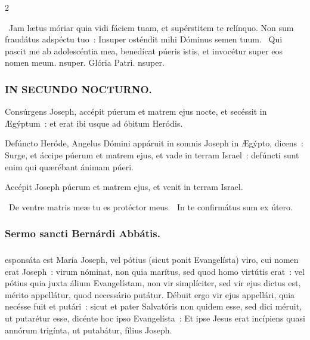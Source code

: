 \documentclass[9pt,twoside]{extarticle}
\begin{document}
\begin{multicols}{2}
{{{\begin{tightlist}{}
\item {}~Jam lætus móriar quia vidi fáciem tuam, et supérstitem te relínquo. Non sum fraudátus adspéctu tuo~: \textred{*} Insuper osténdit mihi Dóminus semen tuum. ~Qui pascit me ab adolescéntia mea, benedícat púeris istis, et invocétur super eos nomen meum. nsuper. Glória Patri. nsuper.
\end{tightlist}

\subsubsection*{\center \textsc{IN SECUNDO NOCTURNO.}}
\begin{tightlist}{}
\item {} Consúrgens Joseph, accépit púerum et matrem ejus nocte, et secéssit in Ægýptum~: et erat ibi usque ad óbitum Heródis.
\item {} Defúncto Heróde, Angelus Dómini appáruit in somnis Joseph in Ægýpto, dicens~: Surge, et áccipe púerum et matrem ejus, et vade in terram Israel~: defúncti sunt enim qui quærébant ánimam púeri.
\item {} Accépit Joseph púerum et matrem ejus, et venit in terram Israel.
\item {}~De ventre matris meæ tu es protéctor meus. ~In te confirmátus sum ex útero.
\end{tightlist}

\subsubsection*{\center Sermo sancti Bernárdi Abbátis.}
\subsubsection*{\center {}}
esponsáta est María Joseph, vel pótius (sicut ponit Evangelísta) viro, cui nomen erat Joseph~: virum nóminat, non quia marítus, sed quod homo virtútis erat~: vel pótius quia juxta álium Evangelístam, non vir simplíciter, sed vir ejus dictus est, mérito appellátur, quod necessário putátur. Débuit ergo vir ejus appellári, quia necésse fuit et putári~: sicut et pater Salvatóris non quidem esse, sed dici méruit, ut putarétur esse, dicénte hoc ipso Evangelísta~: Et ipse Jesus erat incípiens quasi annórum trigínta, ut putabátur, fílius Joseph.

}}}
\end{multicols}
\end{document}
